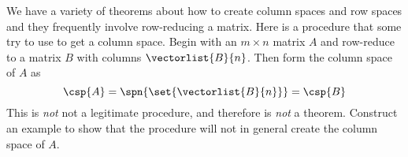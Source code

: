 We have a variety of theorems about how to create column spaces and row spaces and they frequently involve row-reducing a matrix.  Here is a procedure that some try to use to get a column space.  Begin with an $m\times n$ matrix $A$ and row-reduce to a matrix $B$ with columns $\vectorlist{B}{n}$.  Then form the column space of $A$ as
%
\begin{equation*}
\csp{A}=
\spn{\set{\vectorlist{B}{n}}}
=\csp{B}
\end{equation*}
%
This is {\em not} not a legitimate procedure, and therefore is {\em not} a theorem.  Construct an example to show that the procedure will not in general create the column space of $A$.